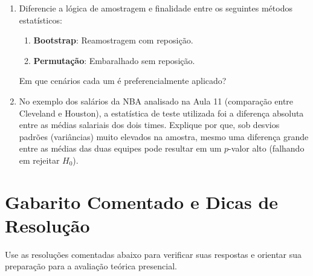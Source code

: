 \documentclass[12pt]{article}
\begin{document}
\begin{enumerate}[label=\textbf{Questão \arabic*}]
    \item Diferencie a lógica de amostragem e finalidade entre os seguintes métodos estatísticos:
    \begin{enumerate}[label=\alph*)]
        \item \textbf{Bootstrap}: Reamostragem com reposição.
        \item \textbf{Permutação}: Embaralhado sem reposição.
    \end{enumerate}
    Em que cenários cada um é preferencialmente aplicado?

    \item No exemplo dos salários da NBA analisado na Aula 11 (comparação entre Cleveland e Houston), a estatística de teste utilizada foi a diferença absoluta entre as médias salariais dos dois times. Explique por que, sob desvios padrões (variâncias) muito elevados na amostra, mesmo uma diferença grande entre as médias das duas equipes pode resultar em um $p$-valor alto (falhando em rejeitar $H_0$).
\end{enumerate}

\pagebreak

\section*{Gabarito Comentado e Dicas de Resolução}

\begin{tcolorbox}[colback=yellow!10!white,colframe=yellow!50!black,title=\textbf{Dica de Estudo}]
Use as resoluções comentadas abaixo para verificar suas respostas e orientar sua preparação para a avaliação teórica presencial.
\end{tcolorbox}
\end{document}
